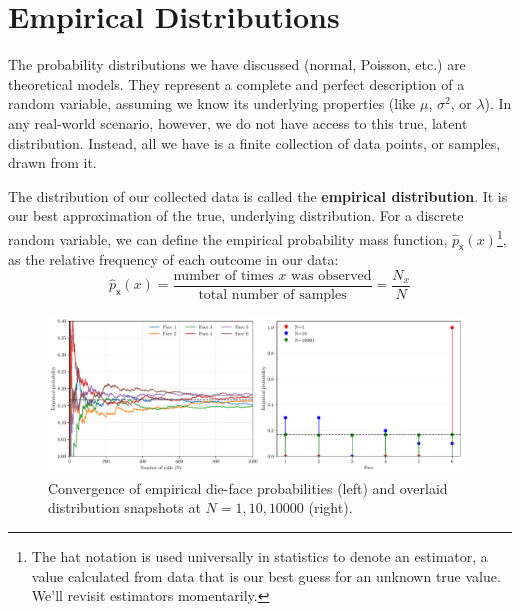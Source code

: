 \section{Empirical Distributions}
The probability distributions we have discussed (normal, Poisson, etc.) are theoretical models. They represent a complete and perfect description of a random variable, assuming we know its underlying properties (like $\mu$, $\sigma^2$, or $\lambda$). In any real-world scenario, however, we do not have access to this true, latent distribution. Instead, all we have is a finite collection of data points, or samples, drawn from it. 

The distribution of our collected data is called the \textbf{empirical distribution}. It is our best approximation of the true, underlying distribution. For a discrete random variable, we can define the empirical probability mass function, $\hat{p}_{\mathsf{x}}(x)$\footnote{The hat notation is used universally in statistics to denote an estimator, a value calculated from data that is our best guess for an unknown true value. We'll revisit estimators momentarily.}, as the relative frequency of each outcome in our data:
\begin{equation}
    \hat{p}_{\mathsf{x}}(x) = \frac{\text{number of times } x \text{ was observed}}{\text{total number of samples}} = \frac{N_x}{N}
\end{equation}

\begin{figure}[h!]
    \centering
    \includegraphics[width=0.98\textwidth]{./figs/probability/empirical_distribution.pdf}
    \caption{Convergence of empirical die-face probabilities (left) and overlaid distribution snapshots at $N=1,10,10000$ (right).}
    \label{fig:die-roll-convergence}
\end{figure}

